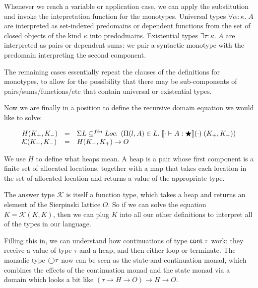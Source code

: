 \documentclass[12pt]{article}
\begin{document}
Whenever we reach a variable or application case, we can apply the
substitution and invoke the intepretation function for the
monotypes. Universal types $\forall \alpha:\kappa.\;A$ are interpreted
as set-indexed predomains or dependent functions from the set of
closed objects of the kind $\kappa$ into predodmains. Existential
types $\exists \tau:\kappa.\;A$ are interpreted as pairs or dependent
sums: we pair a syntactic monotype with the predomain interpreting the
second component.

The remaining cases essentially repeat the clauses of the definitions
for monotypes, to allow for the possibility that there may be
sub-components of pairs/sums/functions/etc that contain universal or
existential types.

Now we are finally in a position to define the recursive domain equation we 
would like to solve:

\begin{displaymath}
\begin{array}{lcl}
H(K_+,K_-) & = & \Sigma L \subseteq^{fin} Loc.\; 
                    \left(\Pi (l,A) \in L.\; 
                             \interp{\judgeWK[\cdot]{A}{\bigstar}}(\cdot)\;(K_+,K_-) 
                    \right)\\

\mathcal{K}(K_+,K_-) & = & H(K_-,K_+) \to O \\    
\end{array}
\end{displaymath}

We use $H$ to define what heaps mean. A heap is a pair whose first
component is a finite set of allocated locations, together with a map
that takes each location in the set of allocated location and returns 
a value of the appropriate type. 

The answer type $\mathcal{K}$ is itself a function type, which takes a
heap and returns an element of the Sierpinski lattice $O$. So if we
can solve the equation $K = \mathcal{K}(K, K)$, then we can plug $K$
into all our other definitions to interpret all of the types in our
language.

Filling this in, we can understand how continuations of type
$\cont{\tau}$ work: they receive a value of type $\tau$ and a heap,
and then either loop or terminate. The monadic type $\monad{\tau}$ now
can be seen as the state-and-continuation monad, which combines the
effects of the continuation monad and the state monad via a domain 
which looks a bit like $(\tau \to H \to O) \to H \to O$. 
\end{document}
